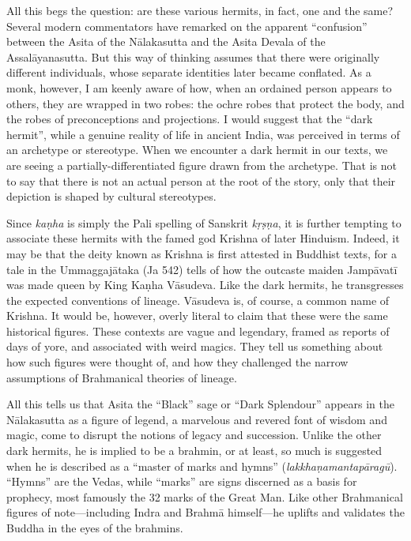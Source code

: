 \documentclass[12pt,openany]{book}%
\begin{document}
All this begs the question: are these various hermits, in fact, one and the same? Several modern commentators have remarked on the apparent “confusion” between the Asita of the \textsanskrit{Nālakasutta} and the Asita Devala of the \textsanskrit{Assalāyanasutta}. But this way of thinking assumes that there were originally different individuals, whose separate identities later became conflated. As a monk, however, I am keenly aware of how, when an ordained person appears to others, they are wrapped in two robes: the ochre robes that protect the body, and the robes of preconceptions and projections. I would suggest that the “dark hermit”, while a genuine reality of life in ancient India, was perceived in terms of an archetype or stereotype. When we encounter a dark hermit in our texts, we are seeing a partially-differentiated figure drawn from the archetype. That is not to say that there is not an actual person at the root of the story, only that their depiction is shaped by cultural stereotypes.

Since \textit{\textsanskrit{kaṇha}} is simply the Pali spelling of Sanskrit \textit{\textsanskrit{kṛṣṇa}}, it is further tempting to associate these hermits with the famed god Krishna of later Hinduism. Indeed, it may be that the deity known as Krishna is first attested in Buddhist texts, for a tale in the \textsanskrit{Ummaggajātaka} (Ja 542) tells of how the outcaste maiden \textsanskrit{Jampāvatī} was made queen by King \textsanskrit{Kaṇha} \textsanskrit{Vāsudeva}. Like the dark hermits, he transgresses the expected conventions of lineage. \textsanskrit{Vāsudeva} is, of course, a common name of Krishna. It would be, however, overly literal to claim that these were the same historical figures. These contexts are vague and legendary, framed as reports of days of yore, and associated with weird magics. They tell us something about how such figures were thought of, and how they challenged the narrow assumptions of Brahmanical theories of lineage.

All this tells us that Asita the “Black” sage or “Dark Splendour” appears in the \textsanskrit{Nālakasutta} as a figure of legend, a marvelous and revered font of wisdom and magic, come to disrupt the notions of legacy and succession. Unlike the other dark hermits, he is implied to be a brahmin, or at least, so much is suggested when he is described as a “master of marks and hymns” (\textit{\textsanskrit{lakkhaṇamantapāragū}}). “Hymns” are the Vedas, while “marks” are signs discerned as a basis for prophecy, most famously the 32 marks of the Great Man. Like other Brahmanical figures of note—including Indra and \textsanskrit{Brahmā} himself—he uplifts and validates the Buddha in the eyes of the brahmins.
\end{document}

